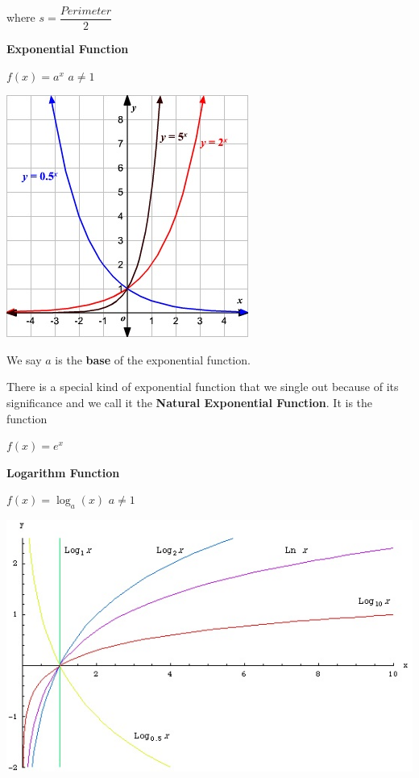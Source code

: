 \documentclass[12pt]{article}
\begin{document}
\vspace{1cm} 

\hspace{4cm} where $s = \dfrac{Perimeter}{2}$

\vspace{1cm}

\textbf{Exponential Function}
\newline

\centerline{$f(x) = a^x$ \hspace{2cm} $a\neq 1$} 

\vspace{.5cm}

\centerline{\includegraphics{ExponentialFunctionsAndGraphs.jpg}}

We say $a$ is the \textbf{base} of the exponential function.

There is a special kind of exponential function that we single out because of its significance and we call it the \textbf{Natural Exponential Function}. It is the function

\centerline{$f(x) = e^{x}$}

\newpage

\textbf{Logarithm Function}
\newline

\centerline{$f(x) = \log_{a}(x)$ \hspace{2cm} $a \neq 1$} 

\vspace{.5cm}

\centerline{\includegraphics{LogGraph.jpg}}
\end{document}

